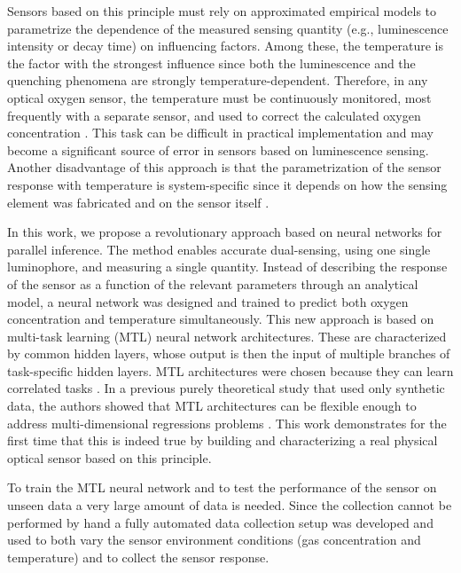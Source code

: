 \documentclass[sensors,article,submit,moreauthors,pdftex,10pt,a4paper]{Definitions/mdpi}
\begin{document}
Sensors based on this principle must rely on approximated empirical models to parametrize the dependence of the measured sensing quantity (e.g., luminescence intensity or decay time) on influencing factors. Among these, the temperature is the factor with the strongest influence since both the luminescence and the quenching phenomena are strongly temperature-dependent. Therefore, in any optical oxygen sensor, the temperature must be continuously monitored, most frequently with a separate sensor, and used to correct the calculated oxygen concentration \cite{Li2015}. This task can be difficult in practical implementation and may become a significant source of error in sensors based on luminescence sensing. Another disadvantage of this approach is that the parametrization of the sensor response with temperature is system-specific since it depends  on how the sensing element was fabricated and on the sensor itself \cite{Xu1994,Draxler1995,Hartmann1996,Mills1998,Badocco2008,Dini2011}.

In this work, we propose a revolutionary approach based on neural networks for parallel inference. The method enables accurate dual-sensing, using one single luminophore, and measuring a single quantity.
Instead of describing the response of the sensor as a function of the relevant parameters through an analytical model, a neural network  was designed and trained to predict both oxygen concentration and temperature simultaneously.
This new approach is based on multi-task learning (MTL) neural network architectures. These are characterized by common hidden layers, whose output is then the input of multiple branches of task-specific hidden layers. MTL architectures were chosen because they can learn correlated tasks \cite{Argyriou2006, Thrun1996, Caruana1997, Zhang2017, Baxter2000, Thung2018}. In a previous purely theoretical study that used only synthetic data, the authors showed that MTL architectures can be flexible enough to address multi-dimensional regressions problems \cite{Michelucci2019_2}. This work demonstrates for the first time that this is indeed true by building and characterizing a real physical optical sensor based on this principle.

To train the MTL neural network and to test the performance of the sensor on unseen data a very large amount of data is needed. Since the collection  cannot be performed by hand a fully automated data collection setup was developed and used to both vary the sensor environment conditions (gas concentration and temperature) and to collect the sensor response. 
\end{document}
